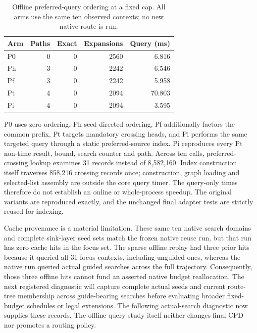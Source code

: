 \begin{table}[t]
\centering
\caption{Offline preferred-query ordering at a fixed cap. All arms use the same ten observed contexts; no new native route is run.}
\label{tab:preferred-query-v14}
\begin{tabular}{lrrrr}
\hline
Arm & Paths & Exact & Expansions & Query (ms)\\
\hline
P0 & 0 & 0 & 2560 & 6.816 \\
Ph & 3 & 0 & 2242 & 6.546 \\
Pf & 3 & 0 & 2242 & 5.958 \\
Pt & 4 & 0 & 2094 & 70.803 \\
Pi & 4 & 0 & 2094 & 3.595 \\
\hline
\end{tabular}
\end{table}
P0 uses zero ordering, Ph seed-directed ordering, Pf additionally factors the common prefix, Pt targets mandatory crossing heads, and Pi performs the same targeted query through a static preferred-source index. Pi reproduces every Pt non-time result, bound, search counter and path. Across ten calls, preferred-crossing lookup examines 31 records instead of 8,582,160. Index construction itself traverses 858,216 crossing records once; construction, graph loading and selected-list assembly are outside the core query timer. The query-only times therefore do not establish an online or whole-process speedup. The original variants are reproduced exactly, and the unchanged final adapter tests are strictly reused for indexing.

Cache provenance is a material limitation. These same ten native search domains and complete sink-layer seed sets match the frozen native reuse run, but that run has zero cache hits in the focus set. The sparse offline replay had three prior hits because it queried all 31 focus contexts, including unguided ones, whereas the native run queried actual guided searches across the full trajectory. Consequently, those three offline hits cannot fund an asserted native budget reallocation. The next registered diagnostic will capture complete actual seeds and current route-tree membership across guide-bearing searches before evaluating broader fixed-budget schedules or legal extensions. The following actual-search diagnostic now supplies these records. The offline query study itself neither changes final CPD nor promotes a routing policy.
